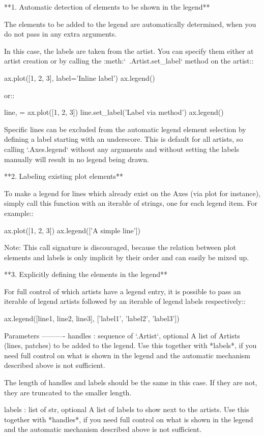 \begin{DoxyVerb}
\begin{DoxyVerb}
**1. Automatic detection of elements to be shown in the legend**

The elements to be added to the legend are automatically determined,
when you do not pass in any extra arguments.

In this case, the labels are taken from the artist. You can specify
them either at artist creation or by calling the
:meth:`~.Artist.set_label` method on the artist::

    ax.plot([1, 2, 3], label='Inline label')
    ax.legend()

or::

    line, = ax.plot([1, 2, 3])
    line.set_label('Label via method')
    ax.legend()

Specific lines can be excluded from the automatic legend element
selection by defining a label starting with an underscore.
This is default for all artists, so calling `.Axes.legend` without
any arguments and without setting the labels manually will result in
no legend being drawn.


**2. Labeling existing plot elements**

To make a legend for lines which already exist on the Axes
(via plot for instance), simply call this function with an iterable
of strings, one for each legend item. For example::

    ax.plot([1, 2, 3])
    ax.legend(['A simple line'])

Note: This call signature is discouraged, because the relation between
plot elements and labels is only implicit by their order and can
easily be mixed up.


**3. Explicitly defining the elements in the legend**

For full control of which artists have a legend entry, it is possible
to pass an iterable of legend artists followed by an iterable of
legend labels respectively::

    ax.legend([line1, line2, line3], ['label1', 'label2', 'label3'])

Parameters
----------
handles : sequence of `.Artist`, optional
    A list of Artists (lines, patches) to be added to the legend.
    Use this together with *labels*, if you need full control on what
    is shown in the legend and the automatic mechanism described above
    is not sufficient.

    The length of handles and labels should be the same in this
    case. If they are not, they are truncated to the smaller length.

labels : list of str, optional
    A list of labels to show next to the artists.
    Use this together with *handles*, if you need full control on what
    is shown in the legend and the automatic mechanism described above
    is not sufficient.


\end{DoxyVerb}
\end{DoxyVerb}
